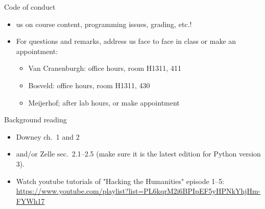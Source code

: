 \documentclass[aspectratio=169,usenames,dvipsnames]{beamer}
\begin{document}
\begin{frame}{Code of conduct}
    \begin{itemize}
        \item {} us on course content,
            programming issues, grading, etc.!
        \item For questions and remarks, address us face to face in class
            or make an appointment:
            \begin{itemize}
                \item Van Cranenburgh: office hours, room H1311, 411
                \item Bosveld: office hours, room H1311, 430
                \item Meijerhof; after lab hours, or make appointment
            \end{itemize}
    \end{itemize}
\end{frame}


\begin{frame}{Background reading}
    \begin{itemize}
        \item Downey ch.\ 1 and 2
        \item and/or Zelle sec.\ 2.1--2.5
            (make sure it is the latest edition for Python version 3).
        \item Watch youtube tutorials of "Hacking the Humanities" episode 1--5:
            \url{https://www.youtube.com/playlist?list=PL6kqrM2i6BPIpEF5yHPNkYhjHm-FYWh17}
    \end{itemize}
\end{frame}
\end{document}

